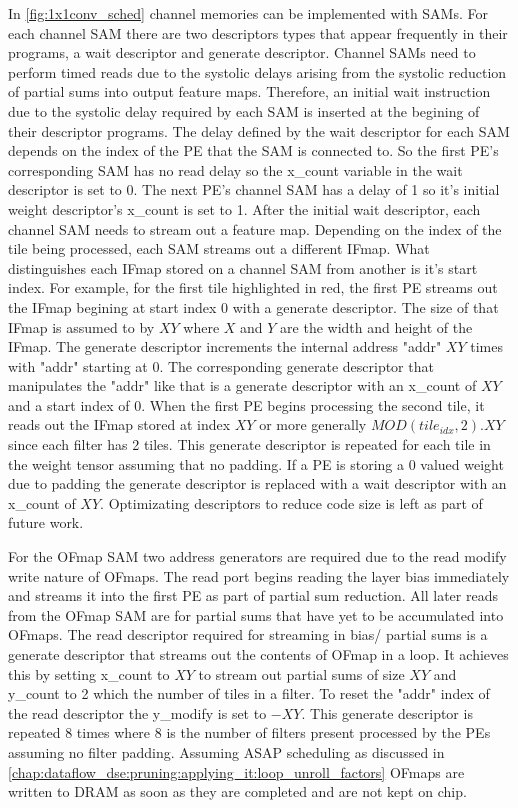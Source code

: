 In \autoref{fig:1x1conv_sched} channel memories can be implemented with SAMs.
For each channel SAM there are two descriptors types that appear frequently in
their programs, a wait descriptor and generate descriptor. Channel SAMs need to
perform timed reads due to the systolic delays arising from the systolic
reduction of partial sums into output feature maps. Therefore, an initial wait
instruction due to the systolic delay required by each SAM is inserted at the
begining of their descriptor programs. The delay defined by the wait descriptor
for each SAM depends on the index of the PE that the SAM is connected to. So the
first PE's corresponding SAM has no read delay so the x\_count variable in the
wait descriptor is set to 0. The next PE's channel SAM has a delay of 1 so it's
initial weight descriptor's x\_count is set to 1. After the initial wait
descriptor, each channel SAM needs to stream out a feature map. Depending on the
index of the tile being processed, each SAM streams out a different IFmap. What
distinguishes each IFmap stored on a channel SAM from another is it's start
index. For example, for the first tile highlighted in red, the first PE streams
out the IFmap begining at start index 0 with a generate descriptor. The size of
that IFmap is assumed to by $XY$ where $X$ and $Y$ are the width and height of
the IFmap. The generate descriptor increments the internal address "addr" $XY$
times with "addr" starting at 0. The corresponding generate descriptor that
manipulates the "addr" like that is a generate descriptor with an x\_count of
$XY$ and a start index of 0. When the first PE begins processing the second
tile, it reads out the IFmap stored at index $XY$ or more generally
$MOD(tile_{idx},2).XY$ since each filter has 2 tiles. This generate descriptor
is repeated for each tile in the weight tensor assuming that no padding. If a PE
is storing a 0 valued weight due to padding the generate descriptor is replaced
with a wait descriptor with an x\_count of $XY$. Optimizating descriptors to
reduce code size is left as part of future work.

For the OFmap SAM two address generators are required due to the read modify
write nature of OFmaps. The read port begins reading the layer bias immediately
and streams it into the first PE as part of partial sum reduction. All later
reads from the OFmap SAM are for partial sums that have yet to be accumulated
into OFmaps. The read descriptor required for streaming in bias/ partial sums is
a generate descriptor that streams out the contents of OFmap in a loop. It
achieves this by setting x\_count to $XY$ to stream out partial sums of size
$XY$ and y\_count to 2 which the number of tiles in a filter. To reset the
"addr" index of the read descriptor the y\_modify is set to $-XY$. This generate
descriptor is repeated 8 times where 8 is the number of filters present
processed by the PEs assuming no filter padding. Assuming ASAP scheduling as
discussed in \autoref{chap:dataflow_dse:pruning:applying_it:loop_unroll_factors}
OFmaps are written to DRAM as soon as they are completed and are not kept on
chip.

